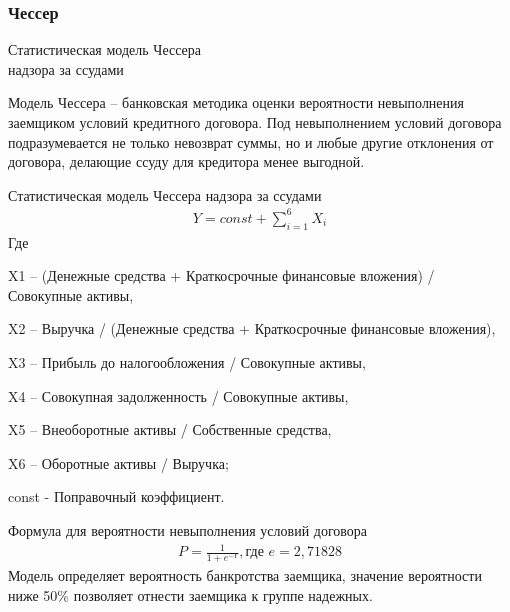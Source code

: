 \documentclass[_Banking_p2.tex]{subfiles}
\begin{document}
\subsubsection{Чессер}
\begin{frame}{Статистическая модель Чессера\\ надзора за ссудами}{}
\begin{block}{Модель Чессера }
\quad – банковская методика оценки вероятности невыполнения заемщиком условий кредитного договора. Под невыполнением условий договора подразумевается не только невозврат суммы, но и любые другие отклонения от договора, делающие ссуду для кредитора менее выгодной.
\end{block}
\end{frame}
\begin{frame}[ allowframebreaks ]{Статистическая модель Чессера надзора за ссудами}
\begin{align}
Y = const + \sum_{i=1}^{6}X_i
\end{align}
Где 

X1 – (Денежные средства + Краткосрочные финансовые вложения) / Совокупные активы,

X2 – Выручка / (Денежные средства + Краткосрочные финансовые вложения),

X3 – Прибыль до налогообложения / Совокупные активы,

X4 – Совокупная задолженность / Совокупные активы,

X5 – Внеоборотные активы / Собственные средства,

X6 – Оборотные активы / Выручка;

const - Поправочный коэффициент.

\pagebreak
Формула для вероятности невыполнения условий договора
\begin{align}
P = \frac{1}{1 + e^{-Y}}, \text{где }  e = 2,71828
\end{align}
Модель определяет вероятность банкротства заемщика, значение вероятности ниже 50\% позволяет отнести заемщика к группе надежных.
\end{frame}
\end{document}
